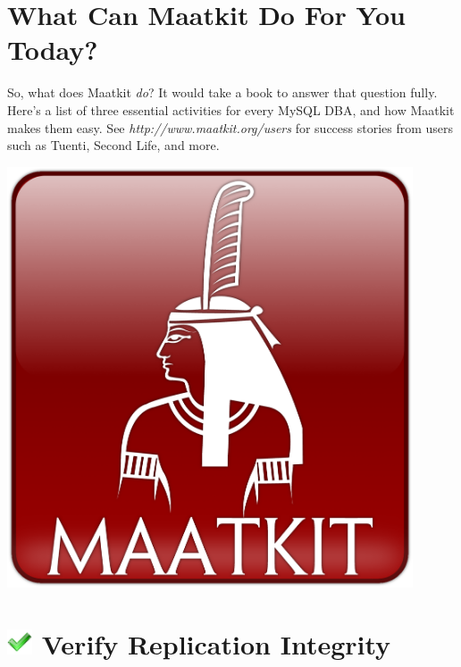 \documentclass[letterpaper,twoside,12pt]{article}
\begin{document}
\begin{minipage}{0.8\textwidth}
\section*{\LARGE What Can Maatkit Do For You Today?}
\normalsize
So, what does Maatkit \emph{do}?  It would take a book to answer that question
fully.  Here's a list of three essential activities for every MySQL DBA, and how
Maatkit makes them easy.  See \emph{http://www.maatkit.org/users} for success
stories from users such as Tuenti, Second Life, and more.
\end{minipage}
\hspace*{0.5cm}
\begin{minipage}{0.2\textwidth}
\includegraphics[width=0.9\textwidth]{../logo/maatkit-logo-glossy.png}
\end{minipage}

\section*{\includegraphics[width=1em]{../image/success} Verify Replication Integrity}
\end{document}
